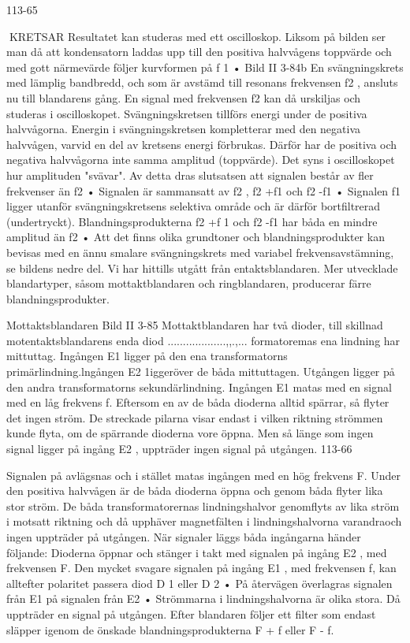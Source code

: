 113-65

KRETSAR
Resultatet kan studeras med ett oscilloskop. Liksom på bilden ser man då att kondensatorn laddas upp till den positiva halvvågens toppvärde och med gott närmevärde
följer kurvformen på f 1 •
Bild II 3-84b
En svängningskrets med lämplig bandbredd, och som är avstämd till resonans
frekvensen f2 , ansluts nu till blandarens
gång. En signal med frekvensen f2 kan då
urskiljas och studeras i oscilloskopet. Svängningskretsen tillförs energi under de positiva
halvvågorna. Energin i svängningskretsen
kompletterar med den negativa halvvågen,
varvid en del av kretsens energi förbrukas.
Därför har de positiva och negativa halvvågorna inte samma amplitud (toppvärde).
Det syns i oscilloskopet hur amplituden
"svävar". Av detta dras slutsatsen att signalen består av fler frekvenser än f2 • Signalen
är sammansatt av f2 , f2 +f1 och f2 -f1 • Signalen
f1 ligger utanför svängningskretsens selektiva område och är därför bortfiltrerad (undertryckt). Blandningsprodukterna f2 +f 1 och f2 -f1
har båda en mindre amplitud än f2 •
Att det finns olika grundtoner och blandningsprodukter kan bevisas med en ännu
smalare svängningskrets med variabel frekvensavstämning, se bildens nedre del.
Vi har hittills utgått från entaktsblandaren.
Mer utvecklade blandartyper, såsom mottaktblandaren och ringblandaren, producerar färre blandningsprodukter.

Mottaktsblandaren
Bild II 3-85
Mottaktblandaren har två dioder, till skillnad
motentaktsblandarens enda diod ...................,,.,...
formatoremas ena lindning har mittuttag.
Ingången E1 ligger på den ena transformatorns primärlindning.lngången E2 1iggeröver
de båda mittuttagen. Utgången ligger på den
andra transformatorns sekundärlindning.
Ingången E1 matas med en signal med
en låg frekvens f. Eftersom en av de båda
dioderna alltid spärrar, så flyter det ingen
ström. De streckade pilarna visar endast i
vilken riktning strömmen kunde flyta, om de
spärrande dioderna vore öppna. Men så
länge som ingen signal ligger på ingång E2 ,
uppträder ingen signal på utgången.
113-66

Signalen på
avlägsnas och i stället
matas ingången
med en hög frekvens F.
Under den positiva halvvågen är de båda
dioderna öppna och genom båda flyter lika
stor ström. De båda transformatorernas
lindningshalvor genomflyts av lika ström i
motsatt riktning och då upphäver magnetfälten i lindningshalvorna varandraoch ingen
uppträder på utgången.
När signaler läggs
båda ingångarna
händer följande:
Dioderna öppnar och stänger i takt med
signalen på ingång E2 , med frekvensen F.
Den mycket svagare signalen på ingång E1 ,
med frekvensen f, kan alltefter polaritet passera diod D 1 eller D 2 • På återvägen överlagras signalen från E1 på signalen från E2 •
Strömmarna i lindningshalvorna är olika
stora. Då uppträder en signal på utgången.
Efter blandaren följer ett filter som endast
släpper igenom de önskade blandningsprodukterna F + f eller F - f.

